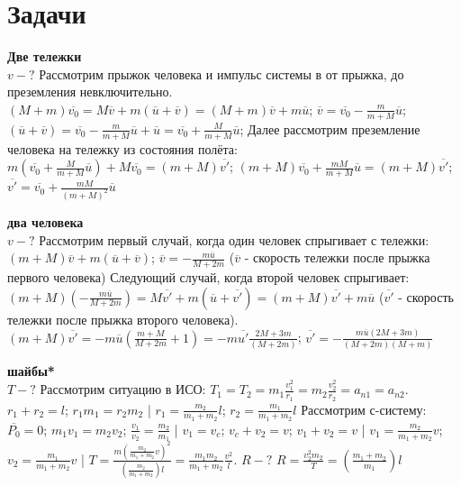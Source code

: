\documentclass{article}
\begin{document}
\section{Задачи}
\begin{minipage}{.3\textwidth}
\textbf{Две тележки}\\
$v-?$ Рассмотрим прыжок человека и импульс системы в от прыжка, до преземления невключительно. $(M+m)\overline{v_0}=M\overline{v}+m(\overline{u}+\overline{v})= (M+m)\overline{v}+m\overline{u}$; 
$\overline{v} = \overline{v_0} - \frac{m}{m+M}\overline{u}$; $(\overline{u}+\overline{v})=\overline{v_0}-\frac{m}{m+M}\overline{u}+\overline{u} = \overline{v_0}+\frac{M}{m+M}\overline{u}$;
Далее рассмотрим преземление человека на тележку из состояния полёта: $m(\overline{v_0}+\frac{M}{m+M}\overline{u})+M\overline{v_0}= (m+M)\overline{v'}$; $(m+M)\overline{v_0}+\frac{mM}{m+M}\overline{u}=(m+M)\overline{v'}$; 
$\overline{v'} = \overline{v_0} + \frac{mM}{(m+M)^2}\overline{u}$
\end{minipage}
\hfill
\begin{minipage}{.3\textwidth}
\textbf{два человека}\\
$v-?$ Рассмотрим первый случай, когда один человек спрыгивает с тележки: $(m+M)\overline{v}+m(\overline{u}+\overline{v})$; $\overline{v} = - \frac{m\overline{u}}{M+2m}$
($\overline{v}$ - скорость тележки после прыжка первого человека)
Следующий случай, когда второй человек спрыгивает: $(m+M)(-\frac{m\overline{u}}{M+2m})=M\overline{v'}+m(\overline{u}+\overline{v'}) = (m+M)\overline{v'}+m\overline{u}$
($\overline{v'}$ - скорость тележки после прыжка второго человека).
$(m+M)\overline{v'} = -m\overline{u}(\frac{m+M}{M+2m}+1) = -m\overline{u'}\frac{2M+3m}{(M+2m)}$; $\overline{v'} = - \frac{m\overline{u}(2M+3m)}{(M+2m)(M+m)}$
\end{minipage}
\hfill
\begin{minipage}{.3\textwidth}
\textbf{шайбы*}\\
$T-?$ Рассмотрим ситуацию в ИСО: $T_1=T_2=m_1\frac{v^2_1}{r_1}=m_2\frac{v^2_2}{r_2}=a_{n1}=a_{n2}$.
$r_1+r_2=l$; $r_1m_1=r_2m_2$  |  $r_1=\frac{m_2}{m_1+m_2}l$; $r_2=\frac{m_1}{m_1+m_2}l$
Рассмотрим с-систему: $\overline{P_0}=0$; $m_1v_1=m_2v_2$; $\frac{v_1}{v_2}=\frac{m_2}{m_1}$  |  $v_1=v_c$; $v_c+v_2=v$; $v_1+v_2=v$  |  $v_1=\frac{m_2}{m_1+m_2}v$; $v_2=\frac{m_1}{m_1+m_2}v$  |  $T=\frac{m(\frac{m_2}{m_1+m_2}v)^2}{(\frac{m_2}{m_1+m_2})l} = \frac{m_1m_2}{m_1+m_2}\frac{v^2}{l}$. $R-?$ $R = \frac{v^2_2m_2}{T} = (\frac{m_1+m_2}{m_1})l$
\end{minipage}
\end{document}
